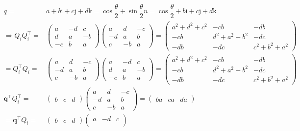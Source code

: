 \documentclass[
]{book}
\theoremstyle{definition}
\theoremstyle{definition}
\theoremstyle{definition}
\theoremstyle{definition}
\theoremstyle{remark}
\begin{document}
\[
\begin{aligned}
q= & a+b\mathrm{i}+c\mathrm{j}+d\mathrm{k}=\cos\dfrac{\theta}{2}+\sin\dfrac{\theta}{2}n=\cos\dfrac{\theta}{2}+b\mathrm{i}+c\mathrm{j}+d\mathrm{k}\\
\Rightarrow Q_{{\scriptscriptstyle i}}Q_{{\scriptscriptstyle i}}^{\intercal}= & \begin{pmatrix}a & -d & c\\
d & a & -b\\
-c & b & a
\end{pmatrix}\begin{pmatrix}a & d & -c\\
-d & a & b\\
c & -b & a
\end{pmatrix}=\begin{pmatrix}a^{2}+d^{2}+c^{2} & -cb & -db\\
-cb & d^{2}+a^{2}+b^{2} & -dc\\
-db & -dc & c^{2}+b^{2}+a^{2}
\end{pmatrix}\\
=Q_{{\scriptscriptstyle i}}^{\intercal}Q_{{\scriptscriptstyle i}}= & \begin{pmatrix}a & d & -c\\
-d & a & b\\
c & -b & a
\end{pmatrix}\begin{pmatrix}a & -d & c\\
d & a & -b\\
-c & b & a
\end{pmatrix}=\begin{pmatrix}a^{2}+d^{2}+c^{2} & -cb & -db\\
-cb & d^{2}+a^{2}+b^{2} & -dc\\
-db & -dc & c^{2}+b^{2}+a^{2}
\end{pmatrix}\\
\boldsymbol{q}^{\intercal}Q_{{\scriptscriptstyle i}}^{\intercal}= & \begin{pmatrix}b & c & d\end{pmatrix}\begin{pmatrix}a & d & -c\\
-d & a & b\\
c & -b & a
\end{pmatrix}=\begin{pmatrix}ba & ca & da\end{pmatrix}\\
=\boldsymbol{q}^{\intercal}Q_{{\scriptscriptstyle i}}= & \begin{pmatrix}b & c & d\end{pmatrix}\begin{pmatrix}a & -d & c\\

\end{pmatrix}
\end{aligned}\]
\end{document}
